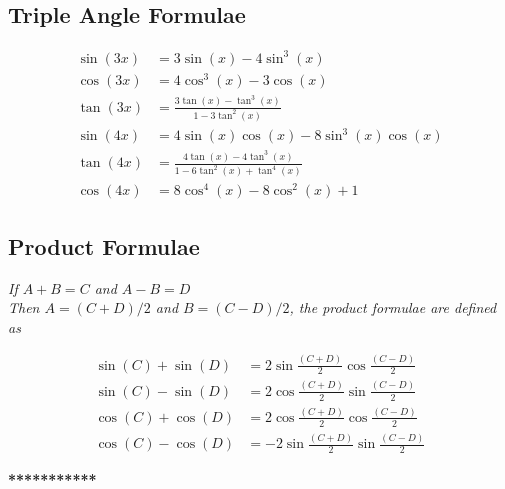 \subsection{Triple Angle Formulae}
\begin{align*}
\sin(3x) &= 3\sin(x) - 4\sin^3(x) \\
\cos(3x) &= 4\cos^3(x) - 3\cos(x) \\
\tan(3x) &= \frac{3\tan(x) - \tan^3(x)}{1-3\tan^2(x)}\\
\sin(4x) &= 4\sin(x)\cos(x) - 8\sin^3(x)\cos(x)\\
\tan(4x) &= \frac{4\tan(x)-4\tan^3(x)}{1-6\tan^2(x)+\tan^4(x)}\\
\cos(4x) &= 8\cos^4(x) - 8\cos^2(x) + 1
\end{align*}


\subsection{Product Formulae}
\textit{If $A+B = C$ and $A-B = D$}\\
\textit{Then $A = (C+D)/2$ and $B = (C-D)/2$, the product formulae are defined as}

\begin{align*}
\sin(C) + \sin(D) &= 2\sin\frac{(C+D)}{2}\cos\frac{(C-D)}{2}\\
\sin(C) - \sin(D) &= 2\cos\frac{(C+D)}{2}\sin\frac{(C-D)}{2}\\
\cos(C) + \cos(D) &= 2\cos\frac{(C+D)}{2}\cos\frac{(C-D)}{2}\\
\cos(C) - \cos(D) &= -2\sin\frac{(C+D)}{2}\sin\frac{(C-D)}{2}
\end{align*}

\vspace{5mm}
\begin{center}
\textbf{***********}
\end{center}
